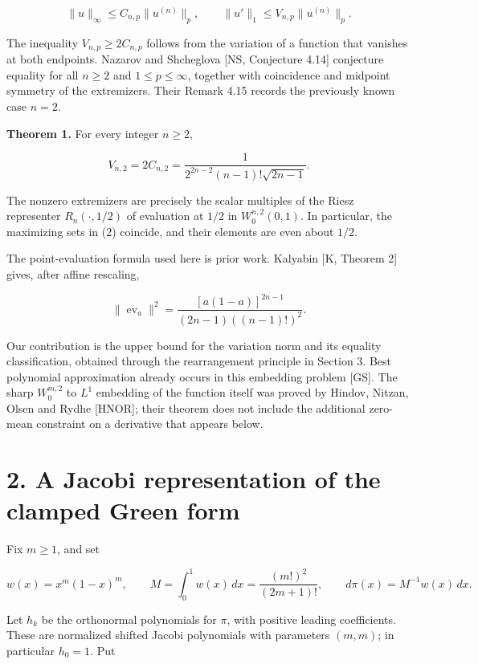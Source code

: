 \documentclass[11pt]{article}
\begin{document}
\[
\|u\|_\infty\le C_{n,p}\|u^{(n)}\|_p,
\qquad
\|u'\|_1\le V_{n,p}\|u^{(n)}\|_p.
\tag{2}
\]

The inequality \(V_{n,p}\ge2C_{n,p}\) follows from the variation of a
function that vanishes at both endpoints. Nazarov and Shcheglova {[}NS,
Conjecture 4.14{]} conjecture equality for all \(n\ge2\) and
\(1\le p\le\infty\), together with coincidence and midpoint symmetry of
the extremizers. Their Remark 4.15 records the previously known case
\(n=2\).

\textbf{Theorem 1.} For every integer \(n\ge2\),

\[
V_{n,2}=2C_{n,2}
=\frac{1}{2^{2n-2}(n-1)!\sqrt{2n-1}}.
\tag{3}
\]

The nonzero extremizers are precisely the scalar multiples of the Riesz
representer \(R_n(\cdot,1/2)\) of evaluation at \(1/2\) in
\(W_0^{n,2}(0,1)\). In particular, the maximizing sets in (2) coincide,
and their elements are even about \(1/2\).

The point-evaluation formula used here is prior work. Kalyabin {[}K,
Theorem 2{]} gives, after affine rescaling,

\[
\|\operatorname{ev}_a\|^2
=\frac{[a(1-a)]^{2n-1}}{(2n-1)((n-1)!)^2}.
\tag{4}
\]

Our contribution is the upper bound for the variation norm and its
equality classification, obtained through the rearrangement principle in
Section 3. Best polynomial approximation already occurs in this
embedding problem {[}GS{]}. The sharp \(W_0^{m,2}\) to \(L^1\) embedding
of the function itself was proved by Hindov, Nitzan, Olsen and Rydhe
{[}HNOR{]}; their theorem does not include the additional zero-mean
constraint on a derivative that appears below.

\section{2. A Jacobi representation of the clamped Green
form}\label{a-jacobi-representation-of-the-clamped-green-form}

Fix \(m\ge1\), and set

\[
w(x)=x^m(1-x)^m,\qquad
M=\int_0^1w(x)\,dx=\frac{(m!)^2}{(2m+1)!},
\qquad d\pi(x)=M^{-1}w(x)\,dx.
\tag{5}
\]

Let \(h_k\) be the orthonormal polynomials for \(\pi\), with positive
leading coefficients. These are normalized shifted Jacobi polynomials
with parameters \((m,m)\); in particular \(h_0=1\). Put
\end{document}
